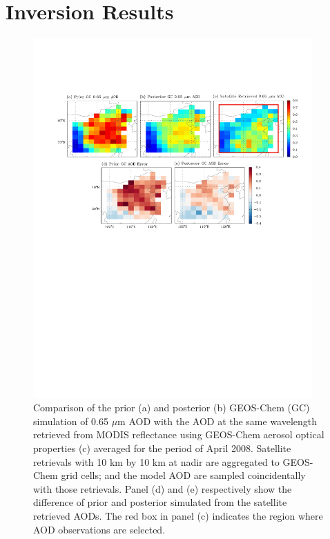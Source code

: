 \section{Inversion Results}

 \begin{figure}[ht]
  \centering
  \includegraphics[width={0.95\textwidth}]{figures/a3.pdf}
  \caption{Comparison of the prior (a) and posterior (b) GEOS-Chem (GC) simulation
 of 0.65 $\mu$m AOD with the AOD at the same wavelength retrieved from
 MODIS reflectance using GEOS-Chem aerosol optical properties (c) averaged
 for the period of April 2008. Satellite retrievals with 10 km by 10 km at nadir
 are aggregated to GEOS-Chem grid cells; and the model AOD are sampled coincidentally
 with those retrievals. Panel (d) and (e) respectively show the difference of
 prior and posterior simulated from the satellite retrieved AODs.
 The red box in panel (c) indicates the region where AOD observations are selected.}
  \label{fig:aod1}
 \end{figure}

